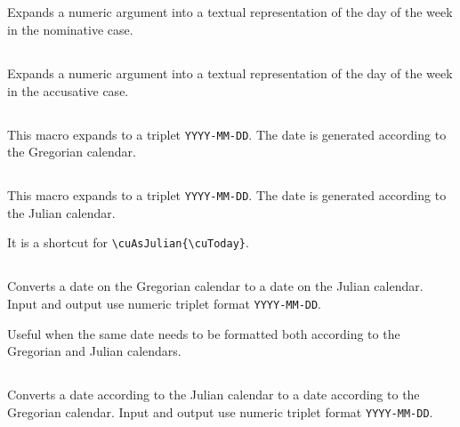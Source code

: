 \begin{EN}
\subsection{}
Expands a numeric argument into a textual representation of the day of the week in the nominative case.

\subsection{}
Expands a numeric argument into a textual representation of the day of the week in the accusative case.

\subsection{}
This macro expands to a triplet \texttt{YYYY-MM-DD}. The date is generated according to the Gregorian calendar.

\subsection{}
This macro expands to a triplet \texttt{YYYY-MM-DD}. The date is generated according to the Julian calendar.

It is a shortcut for \verb+\cuAsJulian{\cuToday}+.

\subsection{}
Converts a date on the Gregorian calendar to a date on the Julian calendar. Input and output use numeric triplet format \texttt{YYYY-MM-DD}.

Useful when the same date needs to be formatted both according to the Gregorian and Julian calendars.

\subsection{}
Converts a date according to the Julian calendar to a date according to the Gregorian calendar. Input and output use numeric triplet format \texttt{YYYY-MM-DD}.

\end{EN}

